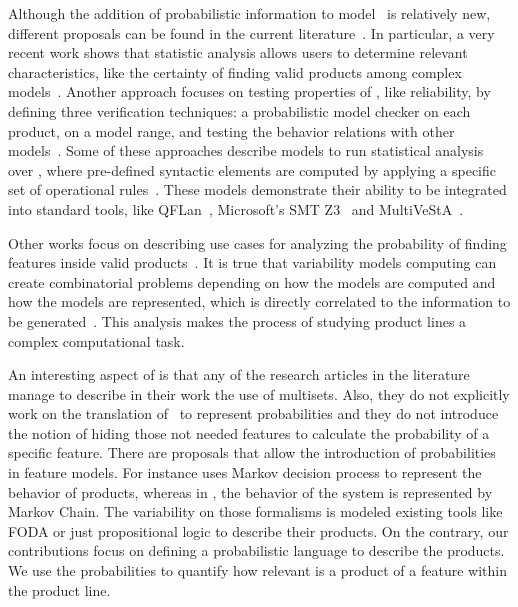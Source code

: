 Although the addition of probabilistic information to model \SPLs\ is relatively new, different proposals can be found in the current literature~\cite{chssgl13,tllv15,tlll15,dpcslsh17}. In particular, a very recent
work shows that statistic analysis allows users to determine relevant characteristics, like the certainty of finding valid products among complex models~\cite{dpcslsh17}.
%
Another approach focuses on testing properties of \SPLs, like reliability, by defining three verification techniques: a probabilistic model checker on each product, on a model range, and testing the behavior relations with other models~\cite{chssgl13}.
%
Some of these approaches describe models to run statistical analysis over \SPLs, where pre-defined syntactic elements are computed by applying a specific set of operational rules~\cite{tllv15,tlll15}. These models demonstrate their ability to be integrated into standard tools, like QFLan~\cite{tlll15}, Microsoft's SMT Z3~\cite{ln08} and MultiVeStA~\cite{sa13}.
%
%

Other works focus on describing use cases for analyzing the probability of finding features inside valid products~\cite{dpcslsh17}.
It is true that variability models computing can create combinatorial problems
depending on how the models are computed and how the models are represented, which is directly
correlated to the information to be generated~\cite{dpcslsh17}.
This analysis makes the process of studying product lines a complex computational  task.

An interesting aspect of \fodaPAp is that
any of the research articles in the literature manage
to describe in their work the use of multisets.
Also, they do not explicitly work on
the translation of \FODA\ to represent probabilities and they do
not introduce the notion of hiding those not needed features to
calculate the probability of a specific feature.
%
%
%
%
%
There are proposals that allow the introduction of probabilities in
feature models. For instance \cite{Dubslaff2015} uses Markov decision
process to represent the behavior of products, whereas in
\cite{vk13}, the behavior of the system is represented by Markov Chain.
The variability on those formalisms is modeled existing tools like FODA or
just propositional logic to describe their products.
On the contrary, our
contributions focus on defining a probabilistic language to describe
the products. We use the probabilities to quantify how relevant is a
product of a feature within the product line.

